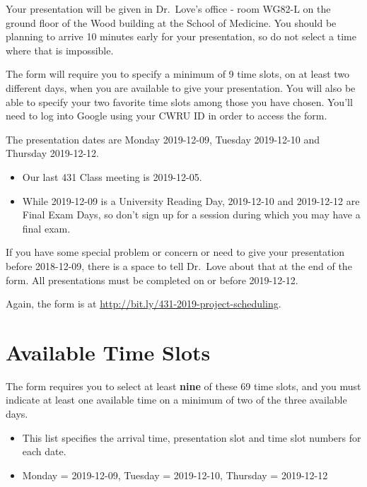 \documentclass[]{book}
\providecommand{\tightlist}{%
  \setlength{\itemsep}{0pt}\setlength{\parskip}{0pt}}
\begin{document}
Your presentation will be given in Dr.~Love's office - room WG82-L on the ground floor of the Wood building at the School of Medicine. You should be planning to arrive 10 minutes early for your presentation, so do not select a time where that is impossible.

The form will require you to specify a minimum of 9 time slots, on at least two different days, when you are available to give your presentation. You will also be able to specify your two favorite time slots among those you have chosen. You'll need to log into Google using your CWRU ID in order to access the form.

The presentation dates are Monday 2019-12-09, Tuesday 2019-12-10 and Thursday 2019-12-12.

\begin{itemize}
\tightlist
\item
  Our last 431 Class meeting is 2019-12-05.
\item
  While 2019-12-09 is a University Reading Day, 2019-12-10 and 2019-12-12 are Final Exam Days, so don't sign up for a session during which you may have a final exam.
\end{itemize}

If you have some special problem or concern or need to give your presentation before 2018-12-09, there is a space to tell Dr.~Love about that at the end of the form. All presentations must be completed on or before 2019-12-12.

Again, the form is at \url{http://bit.ly/431-2019-project-scheduling}.

\hypertarget{available-time-slots}{%
\section{Available Time Slots}\label{available-time-slots}}

The form requires you to select at least \textbf{nine} of these 69 time slots, and you must indicate at least one available time on a minimum of two of the three available days.

\begin{itemize}
\tightlist
\item
  This list specifies the arrival time, presentation slot and time slot numbers for each date.
\item
  Monday = 2019-12-09, Tuesday = 2019-12-10, Thursday = 2019-12-12
\end{itemize}
\end{document}
